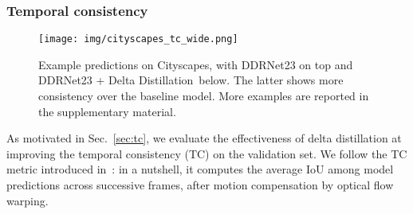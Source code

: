 \documentclass[runningheads]{llncs}
\newcommand{\deltadist}{Delta Distillation~}
\begin{document}
\subsubsection{Temporal consistency}
\begin{figure}[t]
\centering
\texttt{[image: img/cityscapes\_tc\_wide.png]}
\caption{Example predictions on Cityscapes, with DDRNet23 on top and DDRNet23 + \deltadist below. The latter shows more consistency over the baseline model.
More examples are reported in the supplementary material.}
\label{fig:tc_frames}
\vspace{-4mm}
\end{figure} As motivated in Sec.~\ref{sec:tc}, we evaluate the effectiveness of delta distillation at improving the temporal consistency (TC) on the validation set. We follow the TC metric introduced in~\cite{liu2020efficient}: in a nutshell, it computes the average IoU among model predictions across successive frames, after motion compensation by optical flow warping.
\end{document}
